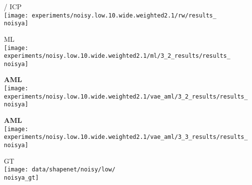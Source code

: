 {\begin{minipage}[t]{0.10\textwidth}
    \cite{Engelmann2016GCPR} / ICP\\[-1px]
   	\texttt{[image: experiments/noisy.low.10.wide.weighted2.1/rw/results\_\\noisya]}
\end{minipage}
\begin{minipage}[t]{0.10\textwidth}
    \vspace{0px}\centering
    \hspace*{3mm}
    ML\\[-1px]
    \texttt{[image: experiments/noisy.low.10.wide.weighted2.1/ml/3\_2\_results/results\_\\noisya]}
\end{minipage}
\begin{minipage}[t]{0.10\textwidth}
   	\vspace{0px}\centering
    \hspace*{3mm}
   	{\bf\color{MPIIorange} AML}\\[-1px]
   	\texttt{[image: experiments/noisy.low.10.wide.weighted2.1/vae\_aml/3\_2\_results/results\_\\noisya]}
\end{minipage}
\begin{minipage}[t]{0.10\textwidth}
   	\vspace{0px}\centering
    \hspace*{3mm}
   	{\bf\color{MPIIorange} AML}\\[-1px]
   	\texttt{[image: experiments/noisy.low.10.wide.weighted2.1/vae\_aml/3\_3\_results/results\_\\noisya]}
\end{minipage}
\begin{minipage}[t]{0.10\textwidth}
   	\vspace{0px}\centering
    \hspace*{3mm}
   	GT\\[-1px]
   	\texttt{[image: data/shapenet/noisy/low/\\noisya\_gt]}

\end{minipage}}
